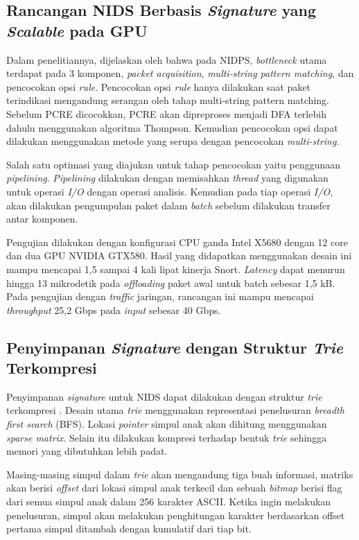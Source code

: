   \subsection{Rancangan NIDS Berbasis \emph{Signature} yang \emph{Scalable} pada GPU}

    Dalam penelitiannya, dijelaskan oleh \textcite{kargus2012} bahwa pada NIDPS, \emph{bottleneck} utama terdapat pada 3 komponen, \emph{packet acquisition}, \emph{multi-string pattern matching}, dan pencocokan opsi \emph{rule}. Pencocokan opsi \emph{rule} hanya dilakukan saat paket terindikasi mengandung serangan oleh tahap multi-string pattern matching. Sebelum PCRE dicocokkan, PCRE akan dipreproses menjadi DFA terlebih dahulu menggunakan algoritma Thompson. Kemudian pencocokan opsi dapat dilakukan menggunakan metode yang serupa dengan pencocokan \emph{multi-string}.

    Salah satu optimasi yang diajukan untuk tahap pencocokan yaitu penggunaan \emph{pipelining}. \emph{Pipelining} dilakukan dengan memisahkan \emph{thread} yang digunakan untuk operasi \emph{I/O} dengan operasi analisis. Kemudian pada tiap operasi \emph{I/O}, akan dilakukan pengumpulan paket dalam \emph{batch} sebelum dilakukan transfer antar komponen. 

    Pengujian dilakukan dengan konfigurasi CPU ganda Intel X5680 dengan 12 core dan dua GPU NVIDIA GTX580. Hasil yang didapatkan menggunakan desain ini mampu mencapai 1,5 sampai 4 kali lipat kinerja Snort. \emph{Latency} dapat menurun hingga 13 mikrodetik pada \emph{offloading} paket awal untuk batch sebesar 1,5 kB. Pada pengujian dengan \emph{traffic} jaringan, rancangan ini mampu mencapai \emph{throughput} 25,2 Gbps pada \emph{input} sebesar 40 Gbps.

  \subsection{Penyimpanan \emph{Signature} dengan Struktur \emph{Trie} Terkompresi}

    Penyimpanan \emph{signature} untuk NIDS dapat dilakukan dengan struktur \emph{trie} terkompresi \parencite{bellekens2014}. Desain utama \emph{trie} menggunakan representasi penelusuran \emph{breadth first search} (BFS). Lokasi \emph{pointer} simpul anak akan dihitung menggunakan \emph{sparse matrix}. Selain itu dilakukan kompresi terhadap bentuk \emph{trie} sehingga memori yang dibutuhkan lebih padat.

    Masing-masing simpul dalam \emph{trie} akan mengandung tiga buah informasi, matriks akan berisi \emph{offset} dari lokasi simpul anak terkecil dan sebuah \emph{bitmap} berisi flag dari semua simpul anak dalam 256 karakter ASCII. Ketika ingin melakukan penelusuran, simpul akan melakukan penghitungan karakter berdasarkan offset pertama simpul ditambah dengan kumulatif dari tiap bit.

